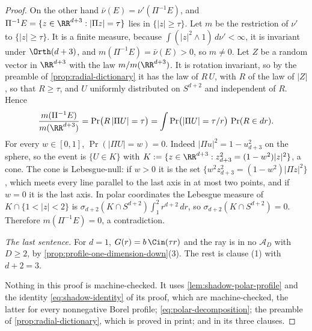 \begin{proof}
On the other hand $\bar\nu(E) = \nu'(\Pi^{-1}E)$, and
$\Pi^{-1}E = \{z \in \RR^{d+3} : |\Pi z| = \tau\}$ lies in $\{|z| \ge \tau\}$. Let $m$ be the
restriction of $\nu'$ to $\{|z| \ge \tau\}$. It is a finite measure, because
$\int(|z|^2 \wedge 1)\,d\nu' < \infty$, it is invariant under $\Orth(d+3)$, and
$m(\Pi^{-1}E) = \bar\nu(E) > 0$, so $m \ne 0$. Let $Z$ be a random vector in $\RR^{d+3}$ with the
law $m/m(\RR^{d+3})$. It is rotation invariant, so by the preamble of
\ref{prop:radial-dictionary} it has the law of $R\,U$, with $R$ of the law of $|Z|$, so that
$R \ge \tau$, and $U$ uniformly distributed on $S^{d+2}$ and independent of $R$. Hence
\[
  \frac{m(\Pi^{-1}E)}{m(\RR^{d+3})} = \Pr\bigl(R\,|\Pi U| = \tau\bigr)
   = \int \Pr\bigl(|\Pi U| = \tau/r\bigr)\,\Pr(R \in dr) .
\]
For every $w \in [0,1]$, $\Pr(|\Pi U| = w) = 0$. Indeed $|\Pi u|^2 = 1 - u_{d+3}^2$ on the
sphere, so the event is $\{U \in K\}$ with $K := \{z \in \RR^{d+3} : z_{d+3}^2 = (1-w^2)|z|^2\}$,
a cone. The cone is Lebesgue-null: if $w > 0$ it is the set
$\{w^2z_{d+3}^2 = (1-w^2)|\Pi z|^2\}$, which meets every line parallel to the last axis in at
most two points, and if $w = 0$ it is the last axis. In polar coordinates the Lebesgue measure
of $K \cap \{1 < |z| < 2\}$ is $\sigma_{d+2}(K \cap S^{d+2})\int_1^2 r^{d+2}\,dr$, so
$\sigma_{d+2}(K \cap S^{d+2}) = 0$. Therefore $m(\Pi^{-1}E) = 0$, a contradiction.

\emph{The last sentence.} For $d = 1$, $G(r) = b\,\Cin(\tau r)$ and the ray is in no
$\mathcal{A}_D$ with $D \ge 2$, by \ref{prop:profile-one-dimension-down}(3). The rest is clause
(1) with $d + 2 = 3$.

Nothing in this proof is machine-checked. It uses \ref{lem:shadow-polar-profile} and the identity
\ref{eq:shadow-identity} of its proof, which are machine-checked, the latter for every
nonnegative Borel profile; \ref{eq:polar-decomposition}; the preamble of
\ref{prop:radial-dictionary}, which is proved in print; and  in its three clauses.
\end{proof}

